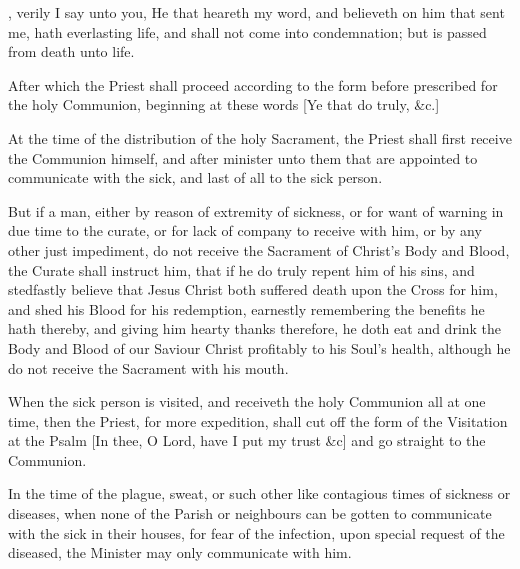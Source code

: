 \newpage

, verily I say unto you, He that heareth my word, and believeth on him that sent me, hath everlasting life, and shall not come into condemnation; but is passed from death unto life.

\begin{rubric}
After which the Priest shall proceed according to the form before prescribed for the holy Communion, beginning at these words [Ye that do truly, \&c.]
\end{rubric}

\begin{rubric}
At the time of the distribution of the holy Sacrament, the Priest shall first receive the Communion himself, and after minister unto them that are appointed to communicate with the sick, and last of all to the sick person.
\end{rubric}

\begin{rubric}
But if a man, either by reason of extremity of sickness, or for want of warning in due time to the curate, or for lack of company to receive with him, or by any other just impediment, do not receive the Sacrament of Christ's Body and Blood, the Curate shall instruct him, that if he do truly repent him of his sins, and stedfastly believe that Jesus Christ both suffered death upon the Cross for him, and shed his Blood for his redemption, earnestly remembering the benefits he hath thereby, and giving him hearty thanks therefore, he doth eat and drink the Body and Blood of our Saviour Christ profitably to his Soul's health, although he do not receive the Sacrament with his mouth.
\end{rubric}

\begin{rubric}
When the sick person is visited, and receiveth the holy Communion all at one time, then the Priest, for more expedition, shall cut off the form of the Visitation at the Psalm [In thee, O Lord, have I put my trust \&c] and go straight to the Communion.
\end{rubric}

\begin{rubric}
In the time of the plague, sweat, or such other like contagious times of sickness or diseases, when none of the Parish or neighbours can be gotten to communicate with the sick in their houses, for fear of the infection, upon special request of the diseased, the Minister may only communicate with him.
\end{rubric}
